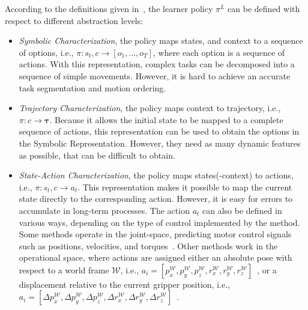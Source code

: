 According to the definitions given in~\cite{osa2018algorithmic,fang2019survey}, the learner policy $\pi^{L}$ can be defined with respect to different abstraction levels:
\begin{itemize}
    \item \textit{Symbolic Characterization}, the policy maps states, and context to a sequence of options, i.e., $\pi: s_{t}, c \rightarrow [o_1, \dots, o_T]$, where each option is a sequence of actions. With this representation, complex tasks can be decomposed into a sequence of simple movements. However, it is hard to achieve an accurate task segmentation and motion ordering.
    \item \textit{Trajectory Characterization}, the policy maps context to trajectory, i.e., $\pi: c \rightarrow \boldsymbol{\tau}$. Because it allows the initial state to be mapped to a complete sequence of actions, this representation can be used to obtain the options in the Symbolic Representation. However, they need as many dynamic features as possible, that can be difficult to obtain.
    \item \textit{State-Action Characterization}, the policy maps states(-context) to actions, i.e., $\pi: s_{t}, c \rightarrow a_{t}$. This representation makes it possible to map the current state directly to the corresponding action. However, it is easy for errors to accumulate in long-term processes. The action $a_{t}$ can also be defined in various ways, depending on the type of control implemented by the method. Some methods operate in the joint-space, predicting motor control signals such as positions, velocities, and torques~\cite{zhang2018deep_vr_teleoperation}. Other methods work in the operational space, where actions are assigned either an absolute pose with respect to a world frame $\mathcal{W}$, i.e., $a_{i} = \left[p_x^{\mathcal{W}}, p_y^{\mathcal{W}}, p_z^{\mathcal{W}}, r_x^{\mathcal{W}}, r_y^{\mathcal{W}}, r_z^{\mathcal{W}}\right]$~\cite{mandi2022towards_more_generalizable_one_shot}, or a displacement relative to the current gripper position, i.e., $a_{i} = \left[\Delta p_x^{\mathcal{W}}, \Delta p_y^{\mathcal{W}}, \Delta p_z^{\mathcal{W}}, \Delta r_x^{\mathcal{W}}, \Delta r_y^{\mathcal{W}}, \Delta r_z^{\mathcal{W}}\right]$~\cite{jang2022bc_z}.

\end{itemize}

